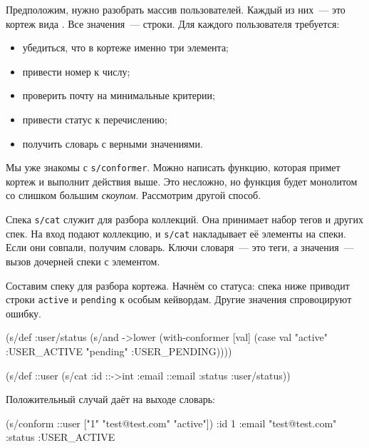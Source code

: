Предположим, нужно разобрать массив пользователей. Каждый из них~--- это кортеж вида
. Все значения~--- строки. Для каждого пользователя
требуется:

\begin{itemize}

\item
  убедиться, что в кортеже именно три элемента;

\item
  привести номер к числу;

\item
  проверить почту на минимальные критерии;

\item
  привести статус к перечислению;

\item
  получить словарь с верными значениями.

\end{itemize}

Мы уже знакомы с \verb|s/conformer|. Можно написать функцию, которая примет
кортеж и выполнит действия выше. Это несложно, но функция будет монолитом со
слишком большим \emph{скоупом}. Рассмотрим другой способ.


Спека \verb|s/cat| служит для разбора коллекций. Она принимает набор тегов и
других спек. На вход подают коллекцию, и \verb|s/cat| накладывает её элементы на
спеки. Если они совпали, получим словарь. Ключи словаря~--- это теги, а значения~---
вызов дочерней спеки с элементом.

Составим спеку для разбора кортежа. Начнём со статуса: спека ниже приводит
строки \verb|active| и \verb|pending| к особым кейвордам. Другие значения
спровоцируют ошибку.

\begin{english}
  \begin{clojure}
(s/def :user/status
  (s/and ->lower
         (with-conformer [val]
           (case val
             "active"  :USER_ACTIVE
             "pending" :USER_PENDING))))

(s/def ::user
  (s/cat :id ::->int
         :email ::email
         :status :user/status))
  \end{clojure}
\end{english}

\noindent
Положительный случай даёт на выходе словарь:

\ifx\devicetype\mobile

\begin{english}
  \begin{clojure}
(s/conform ::user
  ["1" "test@test.com" "active"])
{:id 1
 :email "test@test.com"
 :status :USER_ACTIVE}
  \end{clojure}
\end{english}

